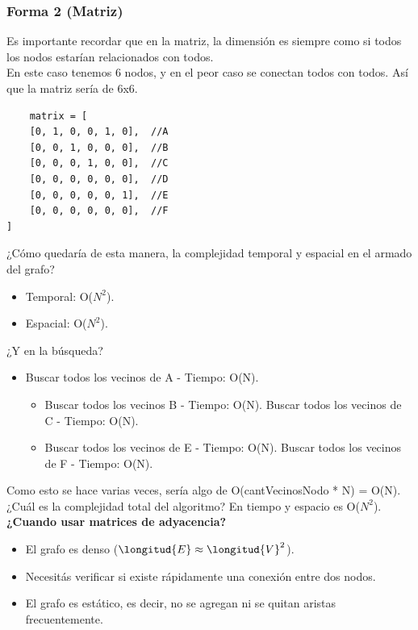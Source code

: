 \documentclass[10pt,a4paper]{article}
\begin{document}
\subsubsection*{Forma 2 (Matriz)}
Es importante recordar que en la matriz, la dimensión es siempre como si todos los nodos estarían relacionados con todos. \\
En este caso tenemos 6 nodos, y en el peor caso se conectan todos con todos. Así que la matriz sería de 6x6. \\
\begin{lstlisting}
    matrix = [
    [0, 1, 0, 0, 1, 0],  //A
    [0, 0, 1, 0, 0, 0],  //B
    [0, 0, 0, 1, 0, 0],  //C
    [0, 0, 0, 0, 0, 0],  //D
    [0, 0, 0, 0, 0, 1],  //E 
    [0, 0, 0, 0, 0, 0],  //F 
]
\end{lstlisting}
¿Cómo quedaría de esta manera, la complejidad temporal y espacial en el armado del grafo? 
\begin{itemize}
    \item Temporal: O($N^{2}$).
    \item Espacial: O($N^{2}$).
\end{itemize}
¿Y en la búsqueda? 
\begin{itemize}
    \item Buscar todos los vecinos de A - Tiempo: O(N).
    \begin{itemize}
        \item Buscar todos los vecinos B - Tiempo: O(N). Buscar todos los vecinos de C - Tiempo: O(N). 
        \item Buscar todos los vecinos de E - Tiempo: O(N). Buscar todos los vecinos de F - Tiempo: O(N).
    \end{itemize}
\end{itemize}
Como esto se hace varias veces, sería algo de O(cantVecinosNodo * N) = O(N). \\
¿Cuál es la complejidad total del algoritmo? En tiempo y espacio es O($N^{2}$). \\
\textbf{¿Cuando usar matrices de adyacencia?}
\begin{itemize}
    \item El grafo es denso ($\longitud{E} \approx \longitud{V}^{2}$).
    \item Necesitás verificar si existe rápidamente una conexión entre dos nodos.
    \item El grafo es estático, es decir, no se agregan ni se quitan aristas frecuentemente.
\end{itemize}
\end{document}
